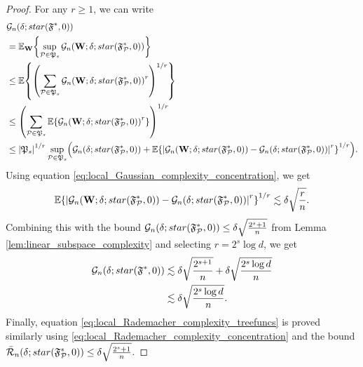 \documentclass[11pt]{article}
\newcommand{\bW}{\mathbf{W}}
\DeclarePairedDelimiter{\braces}{\lbrace}{\rbrace}
\DeclarePairedDelimiter{\paren}{(}{)}
\DeclarePairedDelimiter{\abs}{|}{|}
\newcommand{\E}{\mathbb{E}}
\newcommand{\partition}{\mathcal{P}}
\newcommand{\partitionspace}[1][\sparsity]{\mathfrak{P}_{#1}}
\newcommand{\sparsity}{s}
\newcommand{\nfeats}{d}
\newcommand{\nsamples}{n}
\newcommand{\funcclass}{\mathfrak{F}}
\begin{document}
\begin{proof}
    For any $r \geq 1$, we can write
    \begin{equation}
    \begin{split}
        & \mathcal{G}_n(\delta;\textnormal{star}(\funcclass^*,0)) \\
        & = \E_{\bW}\braces*{\sup_{\partition \in \partitionspace}  \mathcal{G}_n\paren*{\bW; \delta;\textnormal{star}(\funcclass_{\partition}^*,0)} } \\
        & \leq \E\braces*{\paren*{\sum_{\partition \in \partitionspace} \mathcal{G}_n\paren*{\bW; \delta;\textnormal{star}(\funcclass_{\partition}^*,0)}^r}^{1/r}} \\
        & \leq \paren*{\sum_{\partition \in \partitionspace}\E\braces*{ \mathcal{G}_n\paren*{\bW; \delta;\textnormal{star}(\funcclass_{\partition}^*,0)}^r}}^{1/r} \\
        & \leq \abs*{\partitionspace}^{1/r}\sup_{\partition \in \partitionspace}\paren*{ \mathcal{G}_n(\delta;\textnormal{star}(\funcclass_{\partition}^*,0)) + \E\braces*{\abs*{\mathcal{G}_n(\bW;\delta;\textnormal{star}(\funcclass_{\partition}^*,0)) - \mathcal{G}_n(\delta;\textnormal{star}(\funcclass_{\partition}^*,0))}^r}^{1/r} }.
    \end{split}
    \end{equation}
    Using equation \ref{eq:local_Gaussian_complexity_concentration}, we get
    \begin{equation}
        \E\braces*{\abs*{\mathcal{G}_n(\bW;\delta;\textnormal{star}(\funcclass_{\partition}^*,0)) - \mathcal{G}_n(\delta;\textnormal{star}(\funcclass_{\partition}^*,0))}^r}^{1/r} \lesssim \delta\sqrt{\frac{r}{\nsamples}}.
    \end{equation}
    Combining this with the bound $\mathcal{G}_n(\delta;\textnormal{star}(\funcclass_{\partition}^*,0)) \leq \delta\sqrt{\frac{2^s+1}{n}}$ from Lemma \ref{lem:linear_subspace_complexity} and selecting $r = 2^s\log\nfeats$, we get
    \begin{equation}
    \begin{split}
        \mathcal{G}_n(\delta;\textnormal{star}(\funcclass^*,0)) & \lesssim \delta\sqrt{\frac{2^{s+1}}{n}} + \delta\sqrt{\frac{2^s\log d}{n}} \\
        & \lesssim \delta\sqrt{\frac{2^s\log d}{n}}.
    \end{split}
    \end{equation}
    Finally, equation \eqref{eq:local_Rademacher_complexity_treefuncs} is proved similarly using \eqref{eq:local_Rademacher_complexity_concentration} and the bound $\bar{\mathcal{R}}_n(\delta;\textnormal{star}(\funcclass_{\partition}^*,0)) \leq \delta\sqrt{\frac{2^s+1}{n}}$.
\end{proof}
\end{document}
